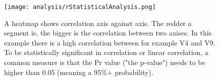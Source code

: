
\begin{figure}[h]
    \centering
    \texttt{[image: analysis/rStatisticalAnalysis.png]}
    \caption{A heatmap shows correlation  axis against axis. The redder a segment is, the bigger is the correlation between two axises. In this example there is a high correlation between for example V4 and V9. To be statistically significant in correlation or linear correlation, a common measure is that the Pr value ("the p-value") needs to be higher than 0.05 (meaning a 95\%+ probability).}
    \label{fig:corrHeatmap}
\end{figure}

\clearpage









